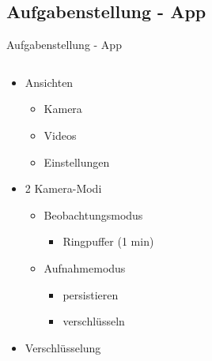\documentclass[19pt]{beamer}
\begin{document}
\subsection{Aufgabenstellung - App}
\begin{frame}{Aufgabenstellung - App}
  \begin{columns}[T]
    \begin{column}{.5\textwidth}
    		\begin{itemize}
    			\item Ansichten
			\begin{itemize}
				\item Kamera
				\item Videos
				\item Einstellungen
			\end{itemize}
			\item 2 Kamera-Modi
			\begin{itemize}
				\item Beobachtungsmodus
				\begin{itemize}
					\item Ringpuffer (1 min)
				\end{itemize}
				\item Aufnahmemodus
				\begin{itemize}
					\item persistieren
					\item verschl\"usseln
				\end{itemize}
			\end{itemize}
			\item Verschl\"usselung
    		\end{itemize}
    \end{column}
    \begin{column}{.5\textwidth}

\end{column}
\end{columns}
\end{frame}
\end{document}
